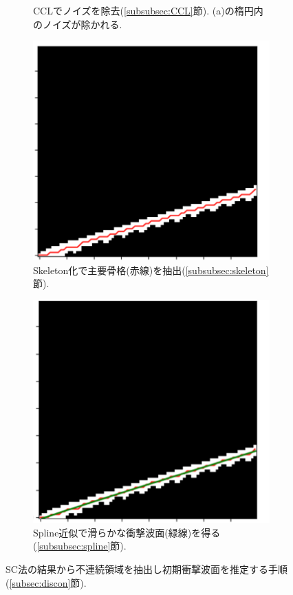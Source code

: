 \documentclass[a4j]{jarticle}
\begin{document}
\begin{figure}[h]
\begin{subfigure}[t]{0.23\textwidth}
    \caption{CCLでノイズを除去(\ref{subsubsec:CCL}節). (a)の楕円内のノイズが除かれる.}
  \end{subfigure}
  \begin{subfigure}[t]{0.235\textwidth}
    \centering
    \includegraphics[width=\linewidth]{extractc.pdf}
    \caption{Skeleton化で主要骨格(赤線)を抽出(\ref{subsubsec:skeleton}節).}
  \end{subfigure}
  \hfill
  \begin{subfigure}[t]{0.23\textwidth}
    \centering
    \includegraphics[width=\linewidth]{extractd.pdf}
    \caption{Spline近似で滑らかな衝撃波面(緑線)を得る(\ref{subsubsec:spline}節).}
  \end{subfigure}

  \caption{SC法の結果から不連続領域を抽出し初期衝撃波面を推定する手順(\ref{subsec:discon}節).}
  \label{fig:extract}
\end{figure}
\end{document}
